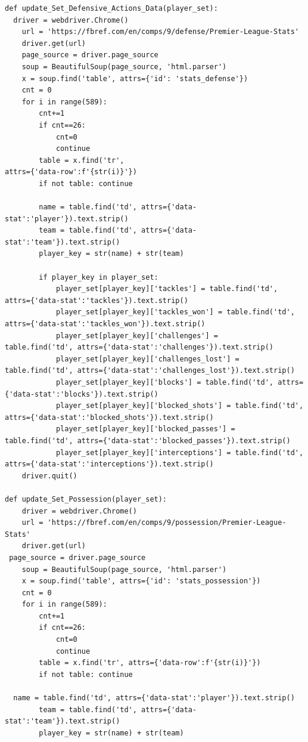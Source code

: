 \documentclass[12pt]{report}
\begin{document}
{\begin{lstlisting}
def update_Set_Defensive_Actions_Data(player_set):
  driver = webdriver.Chrome()
    url = 'https://fbref.com/en/comps/9/defense/Premier-League-Stats'
    driver.get(url)
    page_source = driver.page_source
    soup = BeautifulSoup(page_source, 'html.parser')
    x = soup.find('table', attrs={'id': 'stats_defense'})
    cnt = 0
    for i in range(589):
        cnt+=1
        if cnt==26:
            cnt=0
            continue
        table = x.find('tr',
attrs={'data-row':f'{str(i)}'})
        if not table: continue

        name = table.find('td', attrs={'data-stat':'player'}).text.strip()
        team = table.find('td', attrs={'data-stat':'team'}).text.strip()
        player_key = str(name) + str(team)

        if player_key in player_set:
            player_set[player_key]['tackles'] = table.find('td', attrs={'data-stat':'tackles'}).text.strip()
            player_set[player_key]['tackles_won'] = table.find('td', attrs={'data-stat':'tackles_won'}).text.strip()
            player_set[player_key]['challenges'] =
table.find('td', attrs={'data-stat':'challenges'}).text.strip()
            player_set[player_key]['challenges_lost'] = table.find('td', attrs={'data-stat':'challenges_lost'}).text.strip()
            player_set[player_key]['blocks'] = table.find('td', attrs={'data-stat':'blocks'}).text.strip()
            player_set[player_key]['blocked_shots'] = table.find('td', attrs={'data-stat':'blocked_shots'}).text.strip()
            player_set[player_key]['blocked_passes'] = table.find('td', attrs={'data-stat':'blocked_passes'}).text.strip()
            player_set[player_key]['interceptions'] = table.find('td', attrs={'data-stat':'interceptions'}).text.strip()
    driver.quit()

def update_Set_Possession(player_set):
    driver = webdriver.Chrome()
    url = 'https://fbref.com/en/comps/9/possession/Premier-League-Stats'
    driver.get(url)
 page_source = driver.page_source
    soup = BeautifulSoup(page_source, 'html.parser')
    x = soup.find('table', attrs={'id': 'stats_possession'})
    cnt = 0
    for i in range(589):
        cnt+=1
        if cnt==26:
            cnt=0
            continue
        table = x.find('tr', attrs={'data-row':f'{str(i)}'})
        if not table: continue

  name = table.find('td', attrs={'data-stat':'player'}).text.strip()
        team = table.find('td', attrs={'data-stat':'team'}).text.strip()
        player_key = str(name) + str(team)


\end{lstlisting}}
\end{document}
